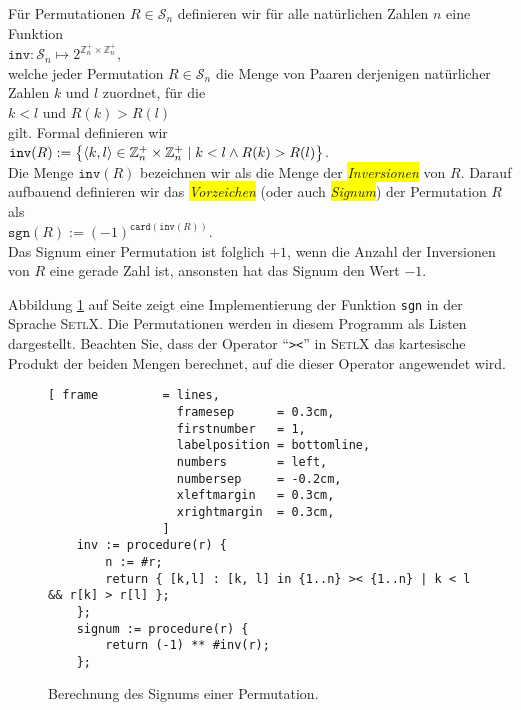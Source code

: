 \begin{Definition}[Signum]
  F\"ur Permutationen $R \in \mathcal{S}_n$ definieren wir f\"ur alle nat\"urlichen Zahlen $n$ eine Funktion
  \\[0.2cm]
  \hspace*{1.3cm}
  $\mathtt{inv} : \mathcal{S}_n \mapsto 2^{\mathbb{Z}_n^+ \times \mathbb{Z}_n^+}$,
  \\[0.2cm]
  welche jeder Permutation $R \in \mathcal{S}_n$ die Menge von Paaren derjenigen nat\"urlicher Zahlen $k$ und $l$
  zuordnet, f\"ur die
  \\[0.2cm]
  \hspace*{1.3cm}
  $k < l$ \quad und \quad $R(k) > R(l)$
  \\[0.2cm]
  gilt.  Formal definieren wir
  \\[0.2cm]
  \hspace*{1.3cm}
  $\mathtt{inv}(R) := \bigl\{ \pair(k,l) \in \mathbb{Z}_n^+ \times \mathbb{Z}_n^+ \mid k < l \wedge  R(k) > R(l) \bigr\}$.
  \\[0.2cm]
  Die Menge $\mathtt{inv}(R)$ bezeichnen wir als die Menge der \colorbox{yellow}{\emph{Inversionen}} von $R$.
  Darauf aufbauend definieren wir das \colorbox{yellow}{\emph{Vorzeichen}} (oder auch
  \colorbox{yellow}{\emph{Signum}}) der Permutation 
  $R$ als 
  \\[0.2cm]
  \hspace*{1.3cm}
  $\mathtt{sgn}(R) := (-1)^{\mathtt{card}(\mathtt{inv}(R))}$.
  \\[0.2cm]
  Das Signum einer Permutation ist folglich $+1$, wenn die Anzahl der Inversionen von $R$ eine gerade
  Zahl ist, ansonsten hat das Signum den Wert $-1$.  \eox
\end{Definition}


Abbildung \ref{fig:signum.stlx} auf Seite \pageref{fig:signum.stlx} zeigt eine Implementierung der
Funktion \texttt{sgn} in der Sprache \textsc{SetlX}.  Die Permutationen werden in diesem Programm
als Listen dargestellt.  Beachten Sie, dass der Operator ``\texttt{><}'' in \textsc{SetlX} das
kartesische Produkt der beiden Mengen berechnet, auf die dieser Operator angewendet wird.


\begin{figure}[!ht]
\centering
\begin{Verbatim}[ frame         = lines, 
                  framesep      = 0.3cm, 
                  firstnumber   = 1,
                  labelposition = bottomline,
                  numbers       = left,
                  numbersep     = -0.2cm,
                  xleftmargin   = 0.3cm,
                  xrightmargin  = 0.3cm,
                ]
    inv := procedure(r) {
        n := #r;
        return { [k,l] : [k, l] in {1..n} >< {1..n} | k < l && r[k] > r[l] };
    };
    signum := procedure(r) {
        return (-1) ** #inv(r);
    };
\end{Verbatim}
\vspace*{-0.3cm}
\caption{Berechnung des Signums einer Permutation.}
\label{fig:signum.stlx}
\end{figure}



